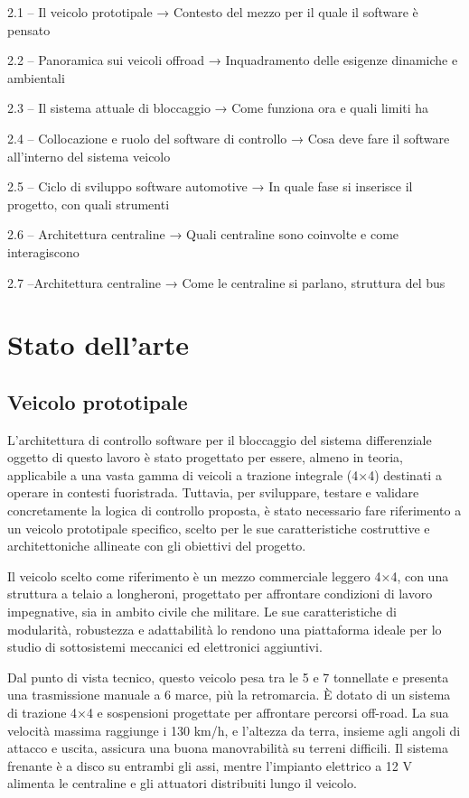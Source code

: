 \documentclass[11pt]{report}
\begin{document}
	
	2.1 – Il veicolo prototipale
	→ Contesto del mezzo per il quale il software è pensato
	
	2.2 – Panoramica sui veicoli offroad
	→ Inquadramento delle esigenze dinamiche e ambientali
	
	2.3 – Il sistema attuale di bloccaggio
	→ Come funziona ora e quali limiti ha
	
	2.4 – Collocazione e ruolo del software di controllo
	→ Cosa deve fare il software all’interno del sistema veicolo
	
	2.5 – Ciclo di sviluppo software automotive
	→ In quale fase si inserisce il progetto, con quali strumenti
	
	2.6 – Architettura centraline
	→ Quali centraline sono coinvolte e come interagiscono
	
	2.7 –Architettura centraline
	→ Come le centraline si parlano, struttura del bus
	
	\chapter{Stato dell'arte}
	
	\section{Veicolo prototipale}

	L'architettura di controllo software per il bloccaggio del sistema differenziale oggetto di questo lavoro è stato progettato per essere, almeno in teoria, applicabile a una vasta gamma di veicoli a trazione integrale (4×4) destinati a operare in contesti fuoristrada. Tuttavia, per sviluppare, testare e validare concretamente la logica di controllo proposta, è stato necessario fare riferimento a un veicolo prototipale specifico, scelto per le sue caratteristiche costruttive e architettoniche allineate con gli obiettivi del progetto.
	
	Il veicolo scelto come riferimento è un mezzo commerciale leggero 4×4, con una struttura a telaio a longheroni, progettato per affrontare condizioni di lavoro impegnative, sia in ambito civile che militare. Le sue caratteristiche di modularità, robustezza e adattabilità lo rendono una piattaforma ideale per lo studio di  sottosistemi meccanici ed elettronici aggiuntivi.
	
	Dal punto di vista tecnico, questo veicolo pesa tra le 5 e 7 tonnellate e presenta una trasmissione manuale a 6 marce, più la retromarcia. È dotato di un sistema di trazione 4×4 e sospensioni progettate per affrontare percorsi off-road. La sua velocità massima raggiunge i 130 km/h, e l'altezza da terra, insieme agli angoli di attacco e uscita, assicura una buona manovrabilità su terreni difficili. Il sistema frenante è a disco su entrambi gli assi, mentre l'impianto elettrico a 12 V alimenta le centraline e gli attuatori distribuiti lungo il veicolo.
	
\end{document}
